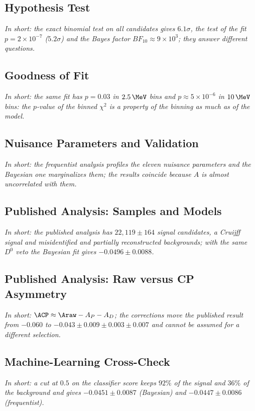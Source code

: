 \subsection{Hypothesis Test}
\label{app:cmp_test}
\emph{In short: the exact binomial test on all candidates gives $6.1\sigma$, the test of the fit $p=2\times10^{-7}$ ($5.2\sigma$) and the Bayes factor $BF_{10}\approx9\times10^3$; they answer different questions.}

\subsection{Goodness of Fit}
\label{app:cmp_gof}
\emph{In short: the same fit has $p=0.03$ in $2.5\,\MeV$ bins and $p\approx5\times10^{-6}$ in $10\,\MeV$ bins: the $p$-value of the binned $\chi^2$ is a property of the binning as much as of the model.}

\subsection{Nuisance Parameters and Validation}
\emph{In short: the frequentist analysis profiles the eleven nuisance parameters and the Bayesian one marginalizes them; the results coincide because $A$ is almost uncorrelated with them.}

\subsection{Published Analysis: Samples and Models}
\label{app:cmp_pubsamples}
\emph{In short: the published analysis has $22{,}119\pm164$ signal candidates, a Cruijff signal and misidentified and partially reconstructed backgrounds; with the same $D^0$ veto the Bayesian fit gives $-0.0496\pm0.0088$.}

\subsection{Published Analysis: Raw versus CP Asymmetry}
\label{app:cmp_pubraw}
\emph{In short: $\ACP\approx\Araw-A_P-A_D$; the corrections move the published result from $-0.060$ to $-0.043\pm0.009\pm0.003\pm0.007$ and cannot be assumed for a different selection.}

\subsection{Machine-Learning Cross-Check}
\emph{In short: a cut at $0.5$ on the classifier score keeps $92\%$ of the signal and $36\%$ of the background and gives $-0.0451\pm0.0087$ (Bayesian) and $-0.0447\pm0.0086$ (frequentist).}

